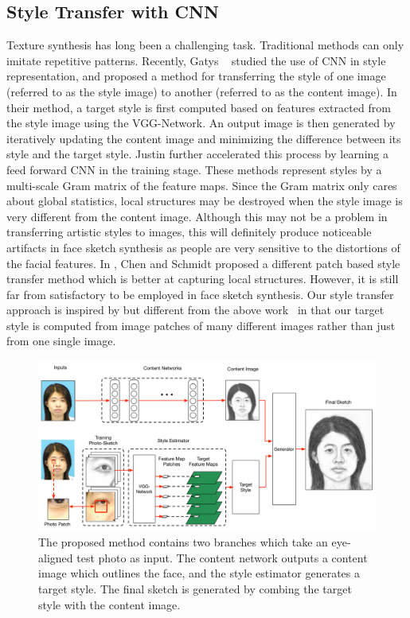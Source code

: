 \documentclass[10pt,twocolumn,letterpaper]{article}
\begin{document}
\subsection{Style Transfer with CNN}
Texture synthesis has long been a challenging task. Traditional methods can only imitate repetitive patterns. Recently, Gatys \etal ~\cite{gatys2015texture,gatys2015neural} studied the use of CNN in style representation, and proposed a method for transferring the style of one image (referred to as the style image) to another (referred to as the content image). In their method, a target style is first computed based on features extracted from the style image using the VGG-Network. An output image is then generated by iteratively updating the content image and minimizing the difference between its style and the target style. Justin \etal \cite{feifei2016} further accelerated this process by learning a feed forward CNN in the training stage. These methods represent styles by a multi-scale Gram matrix of the feature maps. Since the Gram matrix only cares about global statistics, local structures may be destroyed when the style image is very different from the content image. Although this may not be a problem in transferring artistic styles to images, this will definitely produce noticeable artifacts in face sketch synthesis as people are very sensitive to the distortions of the facial features. In \cite{Chen2016Patch}, Chen and Schmidt proposed a different patch based style transfer method which is better at capturing local structures. However, it is still far from satisfactory to be employed in face sketch synthesis. Our style transfer approach is inspired by but different from the above work~\cite{gatys2015texture,gatys2015neural,feifei2016} in that our target style is computed from image patches of many different images rather than just from one single image. 
\begin{figure}[t]
\centering
\includegraphics[width=0.85\linewidth]{img/overview.pdf}
\caption{The proposed method contains two branches which take an eye-aligned test photo as input. The content network outputs a content image which outlines the face, and the style estimator generates a target style. The final sketch is generated by combing the target style with the content image.}
\label{fig:overview}
\end{figure}
\end{document}
